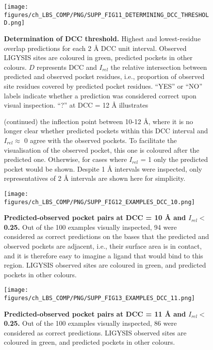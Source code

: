 \begin{figure}
    \centering
    \texttt{[image: figures/ch\_LBS\_COMP/PNG/SUPP\_FIG11\_DETERMINING\_DCC\_THRESHOLD.png]}
    
    \caption[Determination of DCC threshold]{\textbf{Determination of DCC threshold.} Highest and lowest-residue overlap predictions for each 2 \AA{} DCC unit interval. Observed LIGYSIS sites are coloured in green, predicted pockets in other colours. $D$ represents DCC and $I_{rel}$ the relative intersection between predicted and observed pocket residues, i.e., proportion of observed site residues covered by predicted pocket residues. ``YES'' or ``NO'' labels indicate whether a prediction was considered correct upon visual inspection. ``?'' at DCC = 12 \AA{} illustrates    }
    \label{fig:DCC_determination}
\end{figure}

\begin{figure}[ht]
\ContinuedFloat
\caption*{(continued) the inflection point between 10-12 \AA{}, where it is no longer clear whether predicted pockets within this DCC interval and $I_{rel} \approx$ 0 agree with the observed pockets. To facilitate the visualisation of the observed pocket, this one is coloured after the predicted one. Otherwise, for cases where $I_{rel}$ = 1 only the predicted pocket would be shown. Despite 1 \AA{} intervals were inspected, only representatives of 2 \AA{} intervals are shown here for simplicity.}
\end{figure}
\FloatBarrier

\begin{figure}[ht!]
    \centering
    \texttt{[image: figures/ch\_LBS\_COMP/PNG/SUPP\_FIG12\_EXAMPLES\_DCC\_10.png]}
    \caption[Predicted-observed pocket pairs at DCC = 10 \AA{} and $I_{rel} <$ 0.25]{\textbf{Predicted-observed pocket pairs at DCC = 10 \AA{} and $I_{rel} <$ 0.25.} Out of the 100 examples visually inspected, 94 were considered as correct predictions on the bases that the predicted and observed pockets are adjacent, i.e., their surface area is in contact, and it is therefore easy to imagine a ligand that would bind to this region. LIGYSIS observed sites are coloured in green, and predicted pockets in other colours.}
    \label{fig:DCC_10_examples}
\end{figure}
\FloatBarrier

\begin{figure}[ht!]
    \centering
    \texttt{[image: figures/ch\_LBS\_COMP/PNG/SUPP\_FIG13\_EXAMPLES\_DCC\_11.png]}
    \caption[Predicted-observed pocket pairs at DCC = 11 \AA{} and $I_{rel} <$ 0.25]{\textbf{Predicted-observed pocket pairs at DCC = 11 \AA{} and $I_{rel} <$ 0.25.} Out of the 100 examples visually inspected, 86 were considered as correct predictions. LIGYSIS observed sites are coloured in green, and predicted pockets in other colours.}
    \label{fig:DCC_11_examples}
\end{figure}
\FloatBarrier

